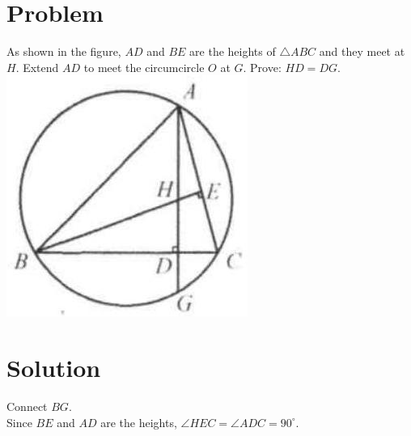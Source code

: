 \documentclass{article}
\begin{document}
\section*{Problem}
As shown in the figure, \(A D\) and \(B E\) are the heights of \(\triangle A B C\) and they meet at \(H\). Extend \(A D\) to meet the circumcircle \(O\) at \(G\). Prove: \(H D=D G\).\\
\centering
\includegraphics[width=\textwidth]{images/206.jpg}

\section*{Solution}
Connect \(B G\).\\
Since \(B E\) and \(A D\) are the heights, \(\angle H E C=\angle A D C=90^{\circ}\).
\end{document}

